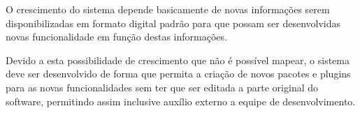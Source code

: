 O crescimento do sistema depende basicamente de novas informações serem disponibilizadas em formato digital padrão para que possam ser desenvolvidas novas funcionalidade em função destas informações.

Devido a esta possibilidade de crescimento que não é possível mapear, o sistema deve ser desenvolvido de forma que permita a criação de novos pacotes e plugins para as novas funcionalidades sem ter que ser editada a parte original do software, permitindo assim inclusive auxílio externo a equipe de desenvolvimento.